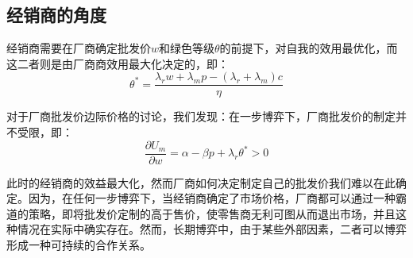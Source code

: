 \documentclass{article}
\begin{document}
\subsection{经销商的角度}
\par 经销商需要在厂商确定批发价$w$和绿色等级$\theta$的前提下，对自我的效用最优化，而这二者则是由厂商商效用最大化决定的，即：
\begin{equation}\label{t_star}
    \theta^*=\frac{\lambda_rw+\lambda_mp-(\lambda_r+\lambda_m)c}{\eta}
\end{equation}
\par 对于厂商批发价边际价格的讨论，我们发现：在一步博弈下，厂商批发价的制定并不受限，即：
\begin{equation}\label{w_star}
    \frac{\partial U_m}{\partial w}=\alpha-\beta p+\lambda_r\theta^*>0
\end{equation}
\par 此时的经销商的效益最大化，然而厂商如何决定制定自己的批发价我们难以在此确定。因为，在任何一步博弈下，当经销商确定了市场价格，厂商都可以通过一种霸道的策略，即将批发价定制的高于售价，使零售商无利可图从而退出市场，并且这种情况在实际中确实存在。然而，长期博弈中，由于某些外部因素，二者可以博弈形成一种可持续的合作关系。
\end{document}
